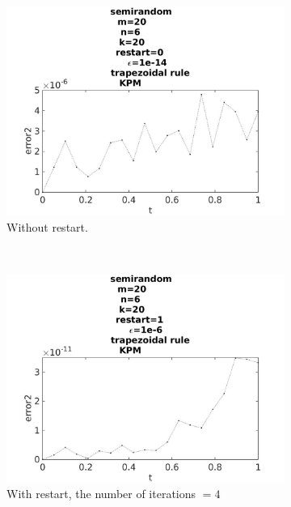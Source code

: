 \begin{figure}[H]
        \begin{subfigure}[b]{0.3\textwidth}
                \includegraphics[width=\textwidth]{../MATLAB/fig/errorarnrestart02.jpg}
                \caption{  Without restart. }
                \label{fig:energyarnrestart02}
        \end{subfigure}%
        ~
        \begin{subfigure}[b]{0.3\textwidth}
                \includegraphics[width=\textwidth]{../MATLAB/fig/errorarnrestart22.jpg}
                \caption{ With restart, the number of iterations $ = 4$ }
                \label{fig:energyarnrestart22}
        \end{subfigure}
        ~
        \begin{subfigure}[b]{0.3\textwidth}

\end{subfigure}
\end{figure}
